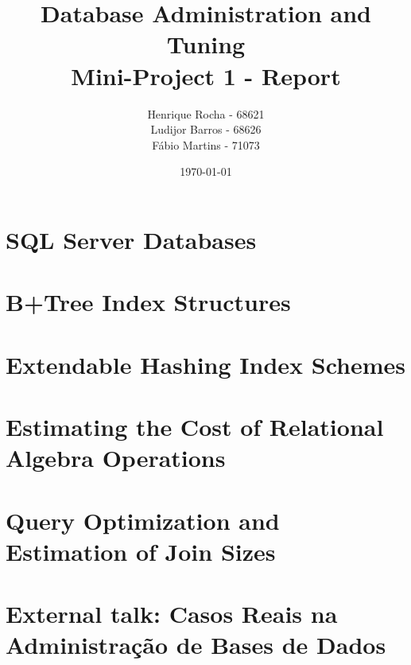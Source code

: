 \documentclass[11pt,report]{article}
\title{	Database Administration and Tuning \\ Mini-Project 1 - Report}
\author{
	Henrique Rocha - 68621 \\
	Ludijor Barros - 68626 \\
	Fábio Martins - 71073
}
\date{\today}
\begin{document}
	\maketitle
\section{SQL Server Databases}

\section{B+Tree Index Structures}

\section{Extendable Hashing Index Schemes}

\section{Estimating the Cost of Relational Algebra Operations}

\section{Query Optimization and Estimation of Join Sizes}
	
\section{External talk: Casos Reais na Administração de Bases de Dados}

\end{document}
